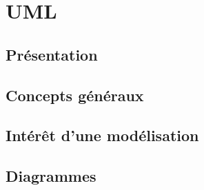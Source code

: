 \chapter{UML}

\section{Présentation}

\section{Concepts généraux}

\section{Intérêt d'une modélisation}

\section{Diagrammes}

\clearpage 